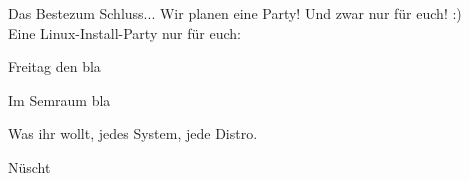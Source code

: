 \begin{frame}{Das Beste}{zum Schluss...}
	Wir planen eine Party! Und zwar nur für euch! :)\\
	Eine Linux-Install-Party nur für euch:\\
	\begin{center}
	\begin{description}[<+->]
		\item[Wann?] Freitag den bla
		\item[Wo?] Im Semraum bla
		\item[Was?] Was ihr wollt, jedes System, jede Distro.
		\item[Koscht?] Nüscht
	\end{description}
	\end{center}
\end{frame}
